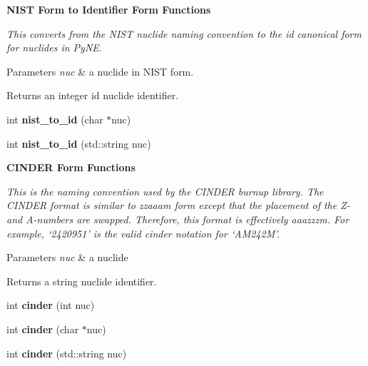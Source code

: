 \begin{Indent}{\bf N\-I\-S\-T Form to Identifier Form Functions}\par
{\em This converts from the N\-I\-S\-T nuclide naming convention to the id canonical form for nuclides in Py\-N\-E. 
\begin{DoxyParams}{Parameters}
{\em nuc} & a nuclide in N\-I\-S\-T form. \\
\hline
\end{DoxyParams}
\begin{DoxyReturn}{Returns}
an integer id nuclide identifier. 
\end{DoxyReturn}
}\begin{DoxyCompactItemize}
\item 
\hypertarget{namespacepyne_1_1nucname_a2ca1363f775916188e495d5571aaa222}{int {\bfseries nist\-\_\-to\-\_\-id} (char $\ast$nuc)}\label{namespacepyne_1_1nucname_a2ca1363f775916188e495d5571aaa222}

\item 
\hypertarget{namespacepyne_1_1nucname_a7ef9fe9b42d5ac9063aab9a649e8dabd}{int {\bfseries nist\-\_\-to\-\_\-id} (std\-::string nuc)}\label{namespacepyne_1_1nucname_a7ef9fe9b42d5ac9063aab9a649e8dabd}

\end{DoxyCompactItemize}
\end{Indent}
\begin{Indent}{\bf C\-I\-N\-D\-E\-R Form Functions}\par
{\em This is the naming convention used by the C\-I\-N\-D\-E\-R burnup library. The C\-I\-N\-D\-E\-R format is similar to zzaaam form except that the placement of the Z-\/ and A-\/numbers are swapped. Therefore, this format is effectively aaazzzm. For example, ‘2420951’ is the valid cinder notation for ‘\-A\-M242\-M’. 
\begin{DoxyParams}{Parameters}
{\em nuc} & a nuclide \\
\hline
\end{DoxyParams}
\begin{DoxyReturn}{Returns}
a string nuclide identifier. 
\end{DoxyReturn}
}\begin{DoxyCompactItemize}
\item 
\hypertarget{namespacepyne_1_1nucname_a72e7d4ad5fb78e4d0f63c3aa4acfbf52}{int {\bfseries cinder} (int nuc)}\label{namespacepyne_1_1nucname_a72e7d4ad5fb78e4d0f63c3aa4acfbf52}

\item 
\hypertarget{namespacepyne_1_1nucname_ab0bbfbc860c6ad54c2e89412965347cd}{int {\bfseries cinder} (char $\ast$nuc)}\label{namespacepyne_1_1nucname_ab0bbfbc860c6ad54c2e89412965347cd}

\item 
\hypertarget{namespacepyne_1_1nucname_ade4d33508b97fd38dcca937e366f324e}{int {\bfseries cinder} (std\-::string nuc)}\label{namespacepyne_1_1nucname_ade4d33508b97fd38dcca937e366f324e}

\end{DoxyCompactItemize}
\end{Indent}
